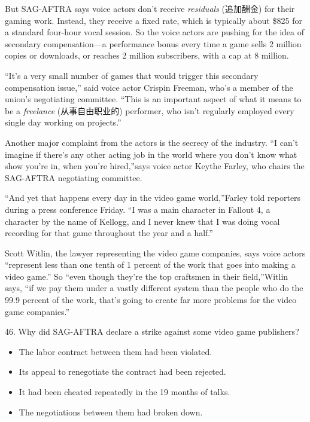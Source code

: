 \documentclass[UTF8,11pt]{ctexart}
\begin{document}
But SAG-AFTRA says voice actors don’t receive\textit{ residuals} (追加酬金) for their gaming work. Instead, they receive a fixed rate, which is typically about \$825 for a standard four-hour vocal session. So the voice actors are pushing for the idea of secondary compensation—a performance bonus every time a game sells 2 million copies or downloads, or reaches 2 million subscribers, with a cap at 8 million.


“It’s a very small number of games that would trigger this secondary compensation issue,” said voice actor Crispin Freeman, who’s a member of the union’s negotiating committee. “This is an important aspect of what it means to be a\textit{ freelance} (从事自由职业的) performer, who isn’t regularly employed every single day working on projects.”


Another major complaint from the actors is the secrecy of the industry. “I can’t imagine if there’s any other acting job in the world where you don’t know what show you’re in, when you’re hired,”says voice actor Keythe Farley, who chairs the SAG-AFTRA negotiating committee.


“And yet that happens every day in the video game world,”Farley told reporters during a press conference Friday. “I was a main character in Fallout 4, a character by the name of Kellogg, and I never knew that I was doing vocal recording for that game throughout the year and a half.”


Scott Witlin, the lawyer representing the video game companies, says voice actors “represent less than one tenth of 1 percent of the work that goes into making a video game.” So “even though they’re the top craftsmen in their field,”Witlin says, “if we pay them under a vastly different system than the people who do the 99.9 percent of the work, that’s going to create far more problems for the video game companies.”


46. Why did SAG-AFTRA declare a strike against some video game publishers?


\begin{itemize}[leftmargin=2em,itemsep=.2em,topsep=.4em]\item[A.] The labor contract between them had been violated.
\item[B.] Its appeal to renegotiate the contract had been rejected.
\item[C.] It had been cheated repeatedly in the 19 months of talks.
\item[D.] The negotiations between them had broken down.
\end{itemize}
\end{document}

